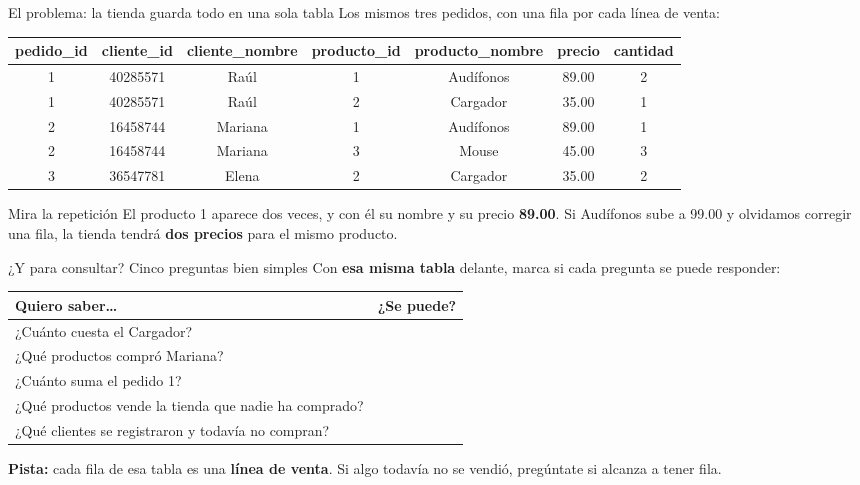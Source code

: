 \documentclass[aspectratio=169,10pt,c]{beamer}
\newcommand{\bl}[1][1.9cm]{\underline{\hspace{#1}}}
\newenvironment{tablaventa}{\footnotesize\setlength\tabcolsep{4.5pt}}{}
\begin{document}
\begin{frame}{El problema: la tienda guarda todo en una sola tabla}
\small Los mismos tres pedidos, con una fila por cada línea de venta:
\vspace{0.2cm}
\begin{center}
\begin{tablaventa}
\begin{tabular}{ccccccc}
\toprule
\bfseries pedido\_id & \bfseries cliente\_id & \bfseries cliente\_nombre & \bfseries producto\_id & \bfseries producto\_nombre & \bfseries precio & \bfseries cantidad \\
\midrule
1 & 40285571 & Raúl    & 1 & Audífonos & 89.00 & 2 \\
1 & 40285571 & Raúl    & 2 & Cargador  & 35.00 & 1 \\
2 & 16458744 & Mariana & 1 & Audífonos & 89.00 & 1 \\
2 & 16458744 & Mariana & 3 & Mouse     & 45.00 & 3 \\
3 & 36547781 & Elena   & 2 & Cargador  & 35.00 & 2 \\
\bottomrule
\end{tabular}
\end{tablaventa}
\end{center}
\vspace{0.4cm}
\begin{alertblock}{Mira la repetición}
\small El producto 1 aparece dos veces, y con él su nombre y su precio \textbf{89.00}. Si Audífonos sube a 99.00 y olvidamos corregir una fila, la tienda tendrá \textbf{dos precios} para el mismo producto.
\end{alertblock}
\end{frame}

\begin{frame}{¿Y para consultar? Cinco preguntas bien simples}
\small Con \textbf{esa misma tabla} delante, marca si cada pregunta se puede responder:
\vspace{0.25cm}
\begin{center}
\small
\begin{tabular}{>{\raggedright\arraybackslash}p{8.6cm}p{2.6cm}}
\toprule
\bfseries Quiero saber\ldots & \bfseries ¿Se puede? \\
\midrule
¿Cuánto cuesta el Cargador? & \bl[2.2cm] \\[4pt]
¿Qué productos compró Mariana? & \bl[2.2cm] \\[4pt]
¿Cuánto suma el pedido 1? & \bl[2.2cm] \\[4pt]
¿Qué productos vende la tienda que nadie ha comprado? & \bl[2.2cm] \\[4pt]
¿Qué clientes se registraron y todavía no compran? & \bl[2.2cm] \\
\bottomrule
\end{tabular}
\end{center}
\vspace{0.25cm}
\small \textbf{Pista:} cada fila de esa tabla es una \textbf{línea de venta}. Si algo todavía no se vendió, pregúntate si alcanza a tener fila.
\end{frame}
\end{document}
